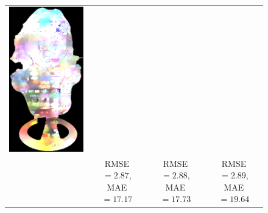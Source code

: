 \begin{figure}
{\begin{tabular}{cccc}
\includegraphics[height=0.25\linewidth]{figures/result/comp_fusion_love_albedo.pdf} \\
& {\small RMSE $= 2.87$, MAE $=17.17$} & {\small RMSE $= 2.88$, MAE $=17.73$} & {\small RMSE $=2.89$, MAE $=19.64$} \\


\end{tabular}}
\end{figure}

